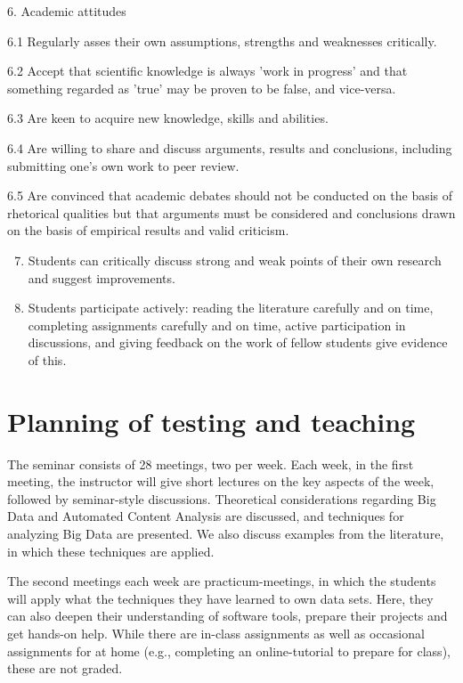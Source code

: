 \documentclass[a4paper,12pt]{report}
\begin{document}
{\footnotesize{
6. Academic attitudes

6.1 	Regularly asses their own assumptions, strengths and weaknesses critically.


6.2	Accept that scientific knowledge is always 'work in progress' and that something
regarded as 'true' may be proven to be false, and vice-versa.


6.3 	Are keen to acquire new knowledge, skills and abilities. 


6.4 	Are willing to share and discuss arguments, results and conclusions, including submitting one's own work to peer review. 


6.5 	Are convinced that academic debates should not be conducted on the basis of rhetorical qualities but that arguments must be considered and conclusions drawn on the basis of empirical results and valid criticism.

 }}

\begin{enumerate}[A]
\setcounter{enumi}{6}
\item Students can critically discuss  strong and weak points of their own research and suggest improvements.
\item Students participate actively: reading the literature carefully and on time, completing assignments carefully and on time, active participation in discussions, and giving feedback on the work of fellow students give evidence of this.
\end{enumerate}



\chapter{Planning of testing and teaching}

The seminar consists of 28 meetings, two per week. Each week, in the first meeting, the instructor will give short lectures on the key aspects of the week, followed by seminar-style discussions. Theoretical considerations regarding Big Data and Automated Content Analysis are discussed, and techniques for analyzing Big Data are presented. We also discuss examples from the literature, in which these techniques are applied.


The second meetings each week are practicum-meetings, in which the students will apply what the techniques they have learned to own data sets. Here, they can also deepen their understanding of software tools, prepare their projects and get hands-on help. While there are in-class assignments as well as occasional assignments for at home (e.g., completing an online-tutorial to prepare for class), these are not graded.
\end{document}
